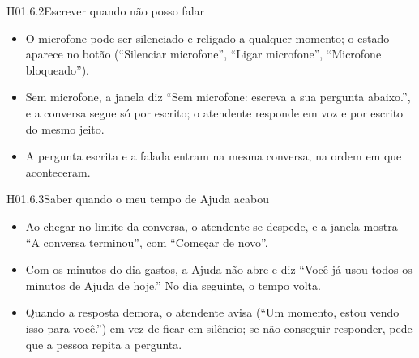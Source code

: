 \begin{historia}{H01.6.2}{Escrever quando não posso falar}{\parcial}
\aceite
\begin{itemize}
  \item O microfone pode ser silenciado e religado a qualquer momento; o
    estado aparece no botão (\enquote{Silenciar microfone},
    \enquote{Ligar microfone}, \enquote{Microfone bloqueado}).
  \item Sem microfone, a janela diz \enquote{Sem microfone: escreva a sua
    pergunta abaixo.}, e a conversa segue só por escrito; o atendente responde
    em voz e por escrito do mesmo jeito.
  \item A pergunta escrita e a falada entram na mesma conversa, na ordem em
    que aconteceram.
\end{itemize}
\end{historia}

\begin{historia}{H01.6.3}{Saber quando o meu tempo de Ajuda acabou}{\parcial}
\aceite
\begin{itemize}
  \item Ao chegar no limite da conversa, o atendente se despede, e a janela
    mostra \enquote{A conversa terminou}, com \enquote{Começar de novo}.
  \item Com os minutos do dia gastos, a Ajuda não abre e diz \enquote{Você já
    usou todos os minutos de Ajuda de hoje.} No dia seguinte, o tempo volta.
  \item Quando a resposta demora, o atendente avisa (\enquote{Um momento,
    estou vendo isso para você.}) em vez de ficar em silêncio; se não
    conseguir responder, pede que a pessoa repita a pergunta.
\end{itemize}
\end{historia}

